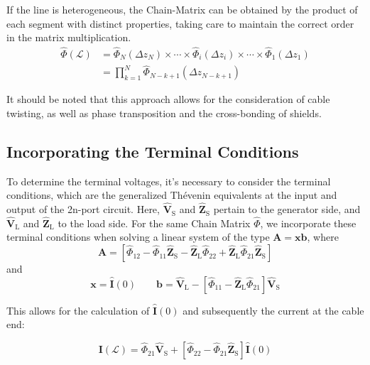 \documentclass[journal,transmag]{IEEEtran}
\begin{document}
If the line is heterogeneous, the Chain-Matrix can be obtained by the product of each segment with distinct properties, taking care to maintain the correct order in the matrix multiplication.
\begin{equation*}
\begin{aligned}
\hat{\Phi}(\mathscr{L}) & =\hat{\Phi}_N\left(\Delta z_N\right) \times \cdots \times \hat{\Phi}_i\left(\Delta z_i\right) \times \cdots \times \hat{\Phi}_1\left(\Delta z_1\right) \\
& =\prod_{k=1}^N \hat{\Phi}_{N-k+1}\left(\Delta z_{N-k+1}\right)
\end{aligned}
\end{equation*}

It should be noted that this approach allows for the consideration of cable twisting, as well as phase transposition and the cross-bonding of shields. 

\subsection{Incorporating the Terminal Conditions}

To determine the terminal voltages, it's necessary to consider the terminal conditions, which are the generalized Thévenin equivalents at the input and output of the 2n-port circuit. Here, $\hat{\mathbf{V}}_{\mathrm{S}}$ and $\hat{\mathbf{Z}}_{\mathrm{S}}$ pertain to the generator side, and $\hat{\mathbf{V}}_{\mathrm{L}}$ and $\hat{\mathbf{Z}}_{\mathrm{L}}$ to the load side. For the same Chain Matrix $\hat{\Phi}$, we incorporate these terminal conditions when solving a linear system of the type $\mathbf{A} = \mathbf{x} \mathbf{b}$, where
\begin{equation}
\mathbf{A} = \left[\hat{\Phi}_{12}-\hat{\Phi}_{11} \hat{\mathbf{Z}}_{\mathrm{S}}-\hat{\mathbf{Z}}_{\mathrm{L}} \hat{\Phi}_{22}+\hat{\mathbf{Z}}_{\mathrm{L}} \hat{\Phi}_{21} \hat{\mathbf{Z}}_{\mathrm{S}}\right]   
\end{equation}
and
\begin{equation}
\mathbf{x} = \hat{\mathbf{I}}(0) \qquad \mathbf{b} = \hat{\mathbf{V}}_{\mathrm{L}}-\left[\hat{\Phi}_{11}-\hat{\mathbf{Z}}_{\mathrm{L}} \hat{\Phi}_{21}\right] \hat{\mathbf{V}}_{\mathrm{S}}
\end{equation}

This allows for the calculation of $\hat{\mathbf{I}}(0)$ and subsequently the current at the cable end:

\begin{equation}
\mathbf{I}(\mathscr{L})=\hat{\Phi}_{21} \hat{\mathbf{V}}_{\mathrm{S}}+\left[\hat{\Phi}_{22}-\hat{\Phi}_{21} \hat{\mathbf{Z}}_{\mathrm{S}}\right] \hat{\mathbf{I}}(0)
\end{equation}
\end{document}
